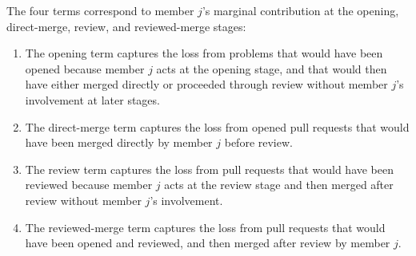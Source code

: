 \documentclass[source/paper/main.tex]{subfiles}
\begin{document}
The four terms correspond to member $j$'s marginal contribution at the opening, direct-merge, review, and reviewed-merge stages:
\begin{enumerate}
    \item The opening term captures the loss from problems that would have been opened because member $j$ acts at the opening stage, and that would then have either merged directly or proceeded through review without member $j$'s involvement at later stages.

    \item The direct-merge term captures the loss from opened pull requests that would have been merged directly by member $j$ before review.

    \item The review term captures the loss from pull requests that would have been reviewed because member $j$ acts at the review stage and then merged after review without member $j$'s involvement.

    \item The reviewed-merge term captures the loss from pull requests that would have been opened and reviewed, and then merged after review by member $j$.
\end{enumerate}
\fi

\end{document}
